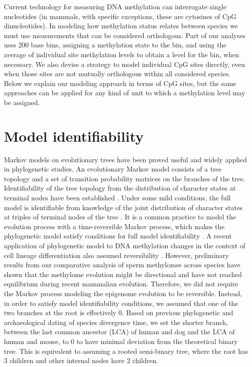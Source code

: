 \documentclass[11pt]{article}
\theoremstyle{theorem}
\theoremstyle{proposition}
\begin{document}
Current technology for measuring DNA methylation can interrogate
single nucleotides (in mammals, with specific exceptions, these are
cytosines of CpG dinucleotides). In modeling how methylation status
relates between species we must use measurements that can be
considered orthologous. Part of our analyses uses 200 base bins,
assigning a methylation state to the bin, and using the average of
individual site methylation levels to obtain a level for the bin, when
necessary. We also devise a strategy to model individual CpG sites
directly, even when those sites are not mutually orthologous within
all considered species. Below we explain our modeling approach in
terms of CpG sites, but the same approaches can be applied for any
kind of unit to which a methylation level may be assigned.

\section{Model identifiability}

Markov models on evolutionary trees have been proved useful and widely
applied in phylogenetic studies. An evolutionary Markov model consists
of a tree topology and a set of transition probability matrices on the
branches of the tree. Identifiability of the tree topology from the
distribution of character states at terminal nodes have been
established
\citep{chang1992reconstruction,steel1995reconstructing}.
Under some mild conditions, the full model is identifiable from
knowledge of the joint distribution of character states at triples of
terminal nodes of the tree \citep{chang1996full}. It is a common
practice to model the evolution process with a time-reversible Markov
process, which makes the phylogenetic model satisfy conditions for
full model identifiability \citep{lio1998models}. A recent application
of phylogenetic model to DNA methylation changes in the context of
cell lineage differentiation also assumed reversibility
\citep{capra2014modeling}. However, preliminary results from our
comparative analysis of sperm methylomes across species have shown
that the methylome evolution might be directional and have not reached
equilibrium during recent mammalian evolution. Therefore, we did not
require the Markov process modeling the epigenome evolution to be
reversible. Instead, in order to satisfy model identifiability
conditions, we assumed that one of the two branches at the root is
effectively $0$. Based on previous phylogenetic and archaeological
dating of species divergence time, we set the shorter branch, between
the last common ancestor (LCA) of human and dog and the LCA of human
and mouse, to $0$ to have minimal deviation from the theoretical
binary tree. This is equivalent to assuming a rooted semi-binary tree,
where the root has 3 children and other internal nodes have 2
children.
\end{document}
